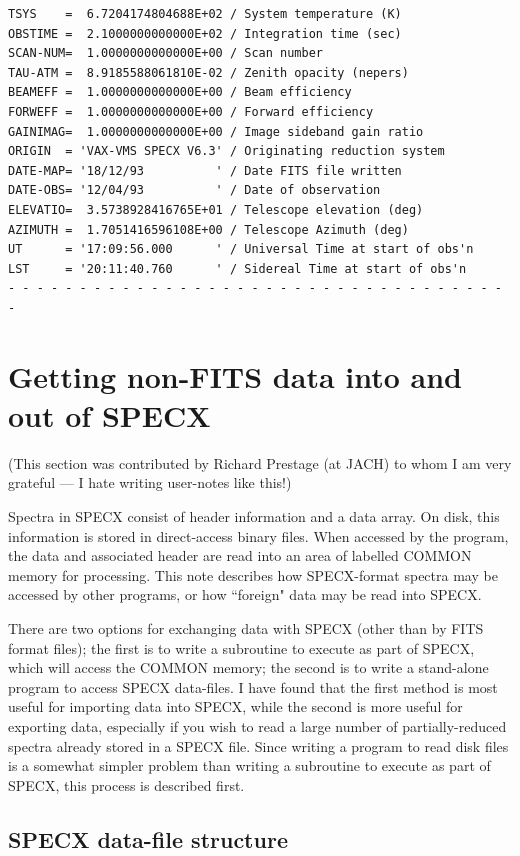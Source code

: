 \documentclass[11pt,twoside]{report}
\begin{document}
\begin{verbatim}
TSYS    =  6.7204174804688E+02 / System temperature (K)
OBSTIME =  2.1000000000000E+02 / Integration time (sec)
SCAN-NUM=  1.0000000000000E+00 / Scan number
TAU-ATM =  8.9185588061810E-02 / Zenith opacity (nepers)
BEAMEFF =  1.0000000000000E+00 / Beam efficiency
FORWEFF =  1.0000000000000E+00 / Forward efficiency
GAINIMAG=  1.0000000000000E+00 / Image sideband gain ratio
ORIGIN  = 'VAX-VMS SPECX V6.3' / Originating reduction system
DATE-MAP= '18/12/93          ' / Date FITS file written
DATE-OBS= '12/04/93          ' / Date of observation
ELEVATIO=  3.5738928416765E+01 / Telescope elevation (deg)
AZIMUTH =  1.7051416596108E+00 / Telescope Azimuth (deg)
UT      = '17:09:56.000      ' / Universal Time at start of obs'n
LST     = '20:11:40.760      ' / Sidereal Time at start of obs'n
- - - - - - - - - - - - - - - - - - - - - - - - - - - - - - - - - - - -
\end{verbatim}

\newpage
\chapter{Getting non-FITS data into and out of SPECX}

(This section was contributed by Richard Prestage (at JACH) to whom I am
very grateful --- I hate writing user-notes like this!)

Spectra in SPECX consist of header information and a data array. On
disk, this information is stored in direct-access binary files. When
accessed by the program, the data and associated header are read into
an area of labelled COMMON memory for processing. This note describes
how SPECX-format spectra may be accessed by other programs, or how
``foreign" data may be read into SPECX.

There are two options for exchanging data with SPECX (other than by FITS
format files); the first is to
write a subroutine to execute as part of SPECX, which will access the
COMMON memory; the second is to write a stand-alone program to access
SPECX data-files. I have found that the first method is most useful
for importing data into SPECX, while the second is more useful for
exporting data, especially if you wish to read a large number of
partially-reduced spectra already stored in a SPECX file. Since
writing a program to read disk files is a somewhat simpler problem
than writing a subroutine to execute as part of SPECX, this process is
described first.

\section{SPECX data-file structure} 
\end{document}
